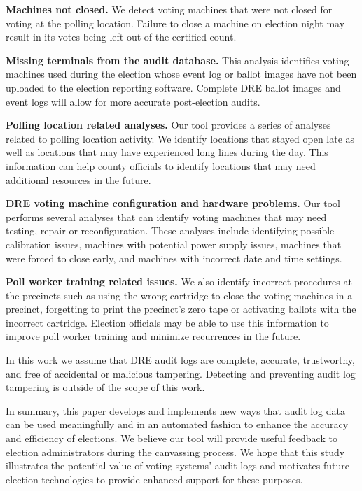 \textbf{Machines not closed.} We detect voting machines that were not
closed for voting at the polling location. Failure to close a machine
on election night may result in its votes being left out of the
certified count.

\textbf{Missing terminals from the audit database.} This analysis
identifies voting machines used during the election whose event log or
ballot images have not been uploaded to the election reporting
software. Complete DRE ballot images and event logs will allow for
more accurate post-election audits. 

\textbf{Polling location related analyses.} Our tool provides a series of analyses related to polling location activity. We identify locations that stayed open late as well as locations that may have experienced long lines during the day. This information can help county officials to identify locations that may need additional resources in the future. 

\textbf{DRE voting machine configuration and hardware problems.} Our tool performs several analyses that can identify  voting machines that may need testing, repair or reconfiguration. These analyses include identifying possible calibration issues, machines with potential power supply issues, machines that were forced to close early, and machines with incorrect date and time settings.

\textbf{Poll worker training related issues.} We also identify incorrect procedures at the precincts such as using the wrong cartridge to close the voting machines in a precinct, forgetting to print the precinct's zero tape or activating ballots with the incorrect cartridge. Election officials may be able to use this information to improve poll worker training and minimize recurrences in the future.

In this work we assume that DRE audit logs are complete, accurate,  trustworthy, and free of accidental or malicious tampering. Detecting and preventing audit log tampering is outside of the scope of this work.

In summary, this paper develops and implements new ways that audit log data can be used meaningfully and in an automated fashion to enhance the accuracy and efficiency of elections. We believe our tool will provide useful feedback to election administrators during the canvassing process. We hope that this study illustrates the potential value of voting systems' audit logs and motivates future election technologies to provide enhanced support for these purposes.



